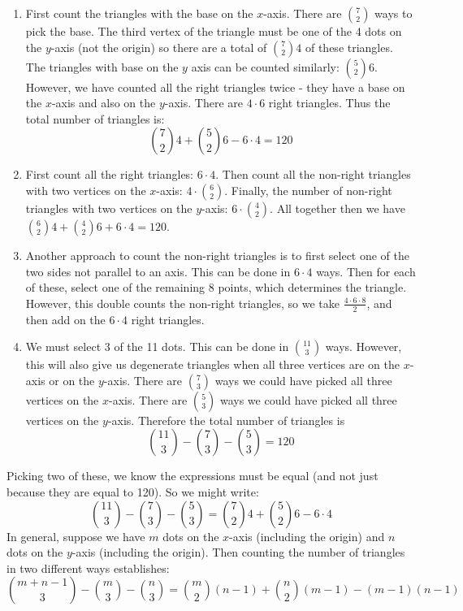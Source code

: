 \begin{questions}
\begin{solution}
   \begin{enumerate}
     \item First count the triangles with the base on the $x$-axis.  There are ${7 \choose 2}$ ways to pick the base.  The third vertex of the triangle must be one of the 4 dots on the $y$-axis (not the origin) so there are a total of ${7 \choose 2}4$ of these triangles.  The triangles with base on the $y$ axis can be counted similarly: ${5 \choose 2}6$.  However, we have counted all the right triangles twice - they have a base on the $x$-axis and also on the $y$-axis.  There are $4 \cdot 6$ right triangles.  Thus the total number of triangles is:
     \[{7 \choose 2}4 + {5 \choose 2}6 - 6\cdot 4 = 120\]
 		\item First count all the right triangles: $6 \cdot 4$.  Then count all the non-right triangles with two vertices on the $x$-axis: $4 \cdot {6 \choose 2}$.  Finally, the number of non-right triangles with two vertices on the $y$-axis: $6 \cdot {4 \choose 2}$.  All together then we have ${6 \choose 2}4 + {4 \choose 2}6 + 6 \cdot 4 = 120$.
 		\item Another approach to count the non-right triangles is to first select one of the two sides not parallel to an axis.  This can be done in $6 \cdot 4$ ways.  Then for each of these, select one of the remaining 8 points, which determines the triangle.  However, this double counts the non-right triangles, so we take $\frac{4\cdot 6 \cdot 8}{2}$, and then add on the $6\cdot 4$ right triangles.
     \item We must select 3 of the 11 dots.  This can be done in ${11 \choose 3}$ ways.  However, this will also give us degenerate triangles when all three vertices are on the $x$-axis or on the $y$-axis.  There are ${7 \choose 3}$ ways we could have picked all three vertices on the $x$-axis.  There are ${5 \choose 3}$ ways we could have picked all three vertices on the $y$-axis.  Therefore the total number of triangles is
     \[{11 \choose 3} - {7 \choose 3} - {5 \choose 3} = 120\]
   \end{enumerate}

 	Picking two of these, we know the expressions must be equal (and not just because they are equal to 120).  So we might write:
 	\[{11 \choose 3} - {7 \choose 3} - {5 \choose 3} = {7 \choose 2}4 + {5 \choose 2}6 - 6\cdot 4\]
 	In general, suppose we have $m$ dots on the $x$-axis (including the origin) and $n$ dots on the $y$-axis (including the origin).  Then counting the number of triangles in two different ways establishes:
 	\[{m+n-1 \choose 3} - {m \choose 3} - {n \choose 3} = {m \choose 2}(n-1) + {n \choose 2}(m-1) - (m-1)(n-1)\]
 \end{solution}






\end{questions}
